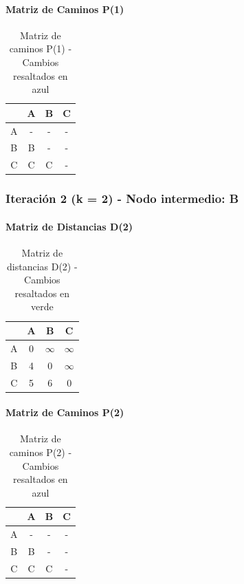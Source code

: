 \documentclass[12pt]{article}
\begin{document}
\paragraph{Matriz de Caminos P(1)}
\begin{table}[h!]
\centering
\begin{tabular}{|c|c|c|c|}
\hline
 & A & B & C \\\hline
A & - & - & - \\\hline
B & B & - & - \\\hline
C & C & C & - \\\hline
\end{tabular}
\caption{Matriz de caminos P(1) - Cambios resaltados en azul}
\end{table}

\subsubsection{Iteración 2 (k = 2) - Nodo intermedio: B}
\paragraph{Matriz de Distancias D(2)}
\begin{table}[h!]
\centering
\begin{tabular}{|c|c|c|c|}
\hline
 & A & B & C \\\hline
A & 0 & $\infty$ & $\infty$ \\\hline
B & 4 & 0 & $\infty$ \\\hline
C & 5 & 6 & 0 \\\hline
\end{tabular}
\caption{Matriz de distancias D(2) - Cambios resaltados en verde}
\end{table}

\paragraph{Matriz de Caminos P(2)}
\begin{table}[h!]
\centering
\begin{tabular}{|c|c|c|c|}
\hline
 & A & B & C \\\hline
A & - & - & - \\\hline
B & B & - & - \\\hline
C & C & C & - \\\hline
\end{tabular}
\caption{Matriz de caminos P(2) - Cambios resaltados en azul}
\end{table}
\end{document}
